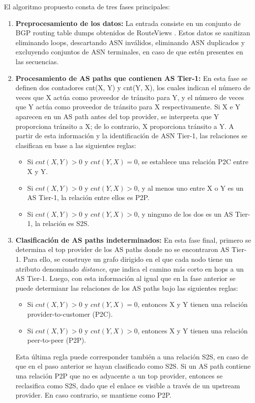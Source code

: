 El algoritmo propuesto consta de tres fases principales:
\begin{enumerate}
    \item \textbf{Preprocesamiento de los datos:} La entrada consiste en un conjunto de BGP routing table dumps obtenidos de RouteViews \cite{RouteViewsProject}. Estos datos se sanitizan eliminando loops, descartando ASN inválidos, eliminando ASN duplicados y excluyendo conjuntos de ASN terminales, en caso de que estén presentes en las secuencias.
    
    \item \textbf{Procesamiento de AS paths que contienen AS Tier-1:} 
    En esta fase se definen dos contadores cnt(X, Y) y cnt(Y, X), los cuales indican el número de veces que X actúa como proveedor de tránsito para Y, y el número de veces que Y actúa como proveedor de tránsito para X respectivamente. Si X e Y aparecen en un AS path antes del top provider, se interpreta que Y proporciona tránsito a X; de lo contrario, X proporciona tránsito a Y. A partir de esta información y la identificación de ASN Tier-1, las relaciones se clasifican en base a las siguientes reglas:


    \begin{itemize}
        \item Si $cnt(X, Y) > 0$ y $cnt(Y, X) = 0$, se establece una relación P2C entre X y Y.
        \item Si $cnt(X, Y) > 0$ y $cnt(Y, X) > 0$, y al menos uno entre X o Y es un AS Tier-1, la relación entre ellos es P2P.
        \item Si $cnt(X, Y) > 0$ y $cnt(Y, X) > 0$, y ninguno de los dos es un AS Tier-1, la relación es S2S.
    \end{itemize}


    \item \textbf{Clasificación de AS paths indeterminados:} En esta fase final, primero se determina el top provider de los AS paths donde no se encontraron AS Tier-1. Para ello, se construye un grafo dirigido en el que cada nodo tiene un atributo denominado \textit{distance}, que indica el camino  más corto en hops a un AS Tier-1. Luego, con esta información al igual que en la fase anterior se puede determianr las relaciones de los AS paths bajo las siguientes reglas:

    \begin{itemize}
        \item Si $cnt(X, Y) > 0$ y $cnt(Y, X) = 0$, entonces X y Y tienen una relación provider-to-customer (P2C).
        \item Si $cnt(X, Y) > 0$ y $cnt(Y, X) > 0$, entonces X y Y tienen una relación peer-to-peer (P2P).
    \end{itemize}
  Esta última regla puede corresponder también a una relación S2S, en caso de que en el paso anterior se hayan clasificado como S2S. Si un AS path contiene una relación P2P que no es adyacente a un top provider, entonces se reclasifica como S2S, dado que el enlace es visible a través de un upstream provider. En caso contrario, se mantiene como P2P.


\end{enumerate}



